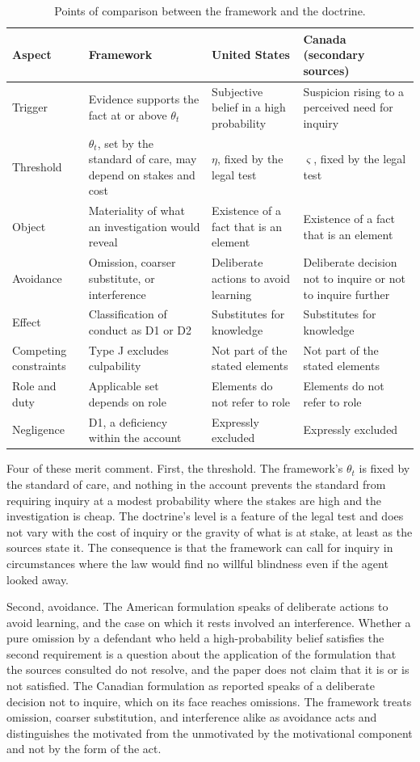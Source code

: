 \documentclass[11pt]{article}
\theoremstyle{plain}
\theoremstyle{definition}
\begin{document}
\begin{table}[h]
\centering
\small
\renewcommand{\arraystretch}{1.25}
\begin{tabular}{p{2.1cm}p{3.7cm}p{3.5cm}p{3.5cm}}
\hline
Aspect & Framework & United States & Canada (secondary sources) \\
\hline
Trigger & Evidence supports the fact at or above $\theta_t$ & Subjective belief in a high probability & Suspicion rising to a perceived need for inquiry \\
Threshold & $\theta_t$, set by the standard of care, may depend on stakes and cost & $\eta$, fixed by the legal test & $\varsigma$, fixed by the legal test \\
Object & Materiality of what an investigation would reveal & Existence of a fact that is an element & Existence of a fact that is an element \\
Avoidance & Omission, coarser substitute, or interference & Deliberate actions to avoid learning & Deliberate decision not to inquire or not to inquire further \\
Effect & Classification of conduct as D1 or D2 & Substitutes for knowledge & Substitutes for knowledge \\
Competing constraints & Type J excludes culpability & Not part of the stated elements & Not part of the stated elements \\
Role and duty & Applicable set depends on role & Elements do not refer to role & Elements do not refer to role \\
Negligence & D1, a deficiency within the account & Expressly excluded & Expressly excluded \\
\hline
\end{tabular}
\caption{Points of comparison between the framework and the doctrine.}
\label{tab:diverge}
\end{table}

Four of these merit comment. First, the threshold. The framework's $\theta_t$ is fixed by the standard of care, and nothing in the account prevents the standard from requiring inquiry at a modest probability where the stakes are high and the investigation is cheap. The doctrine's level is a feature of the legal test and does not vary with the cost of inquiry or the gravity of what is at stake, at least as the sources state it. The consequence is that the framework can call for inquiry in circumstances where the law would find no willful blindness even if the agent looked away.

Second, avoidance. The American formulation speaks of deliberate actions to avoid learning, and the case on which it rests involved an interference. Whether a pure omission by a defendant who held a high-probability belief satisfies the second requirement is a question about the application of the formulation that the sources consulted do not resolve, and the paper does not claim that it is or is not satisfied. The Canadian formulation as reported speaks of a deliberate decision not to inquire, which on its face reaches omissions. The framework treats omission, coarser substitution, and interference alike as avoidance acts and distinguishes the motivated from the unmotivated by the motivational component and not by the form of the act.
\end{document}
